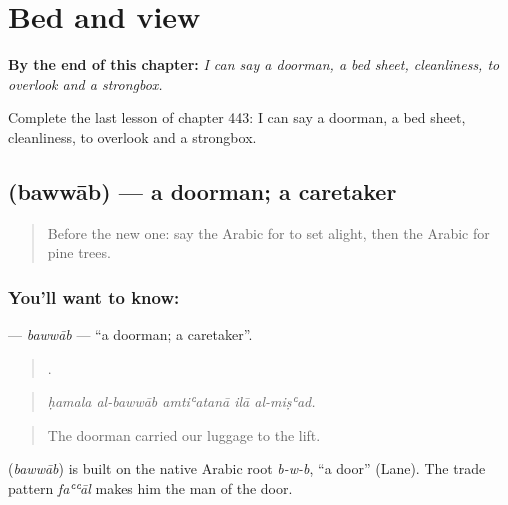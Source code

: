
\chapter{Bed and view}
\label{ch:ar-bed-and-view}

\begin{chapteropening}
\textbf{By the end of this chapter:} \emph{I can say a doorman, a bed sheet, cleanliness, to overlook and a strongbox.}

Complete the last lesson of chapter 443: I can say a doorman, a bed sheet, cleanliness, to overlook and a strongbox.
\end{chapteropening}

\section[\texorpdfstring{\ar{بواب} (bawwāb)}{بواب (bawwāb)}]{ (bawwāb) — a doorman; a caretaker}

\label{lesson:AR-C443-bawwab}



\begin{quote}
Before the new one: say the Arabic for to set alight, then the Arabic for pine trees.
\end{quote}

\subsection*{You'll want to know: }
\textbf{} — \emph{bawwāb} — \textquotedblleft{}a doorman; a caretaker\textquotedblright{}.

\begin{quote}
    .
\end{quote}

\begin{quote}
\emph{ḥamala al-bawwāb amtiʿatanā ilā al-miṣʿad.}
\end{quote}

\begin{quote}
The doorman carried our luggage to the lift.
\end{quote}

\begin{cousinweb}
\textbf{} (\emph{bawwāb}) is built on the native Arabic root \emph{b-w-b}, \textquotedblleft{}a door\textquotedblright{} (Lane). The trade pattern \emph{faʿʿāl} makes him the man of the door.
\end{cousinweb}


